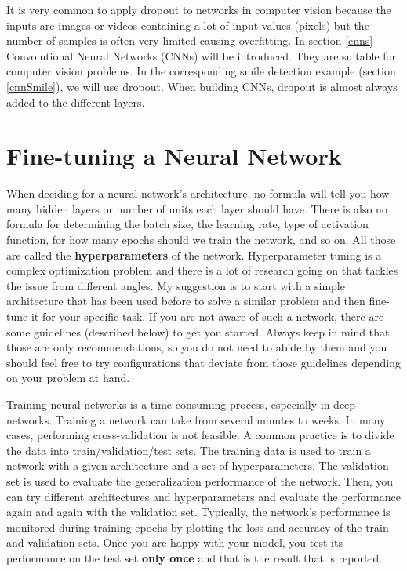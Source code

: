 \documentclass[
  11pt,
]{krantz}
\begin{document}
It is very common to apply dropout to networks in computer vision because the inputs are images or videos containing a lot of input values (pixels) but the number of samples is often very limited causing overfitting. In section \ref{cnns} Convolutional Neural Networks (CNNs) will be introduced. They are suitable for computer vision problems. In the corresponding smile detection example (section \ref{cnnSmile}), we will use dropout. When building CNNs, dropout is almost always added to the different layers.

\hypertarget{fine-tuning-a-neural-network}{%
\section{Fine-tuning a Neural Network}\label{fine-tuning-a-neural-network}}

When deciding for a neural network's architecture, no formula will tell you how many hidden layers or number of units each layer should have. There is also no formula for determining the batch size, the learning rate, type of activation function, for how many epochs should we train the network, and so on. All those are called the \textbf{hyperparameters} of the network. Hyperparameter tuning is a complex optimization problem and there is a lot of research going on that tackles the issue from different angles. My suggestion is to start with a simple architecture that has been used before to solve a similar problem and then fine-tune it for your specific task. If you are not aware of such a network, there are some guidelines (described below) to get you started. Always keep in mind that those are only recommendations, so you do not need to abide by them and you should feel free to try configurations that deviate from those guidelines depending on your problem at hand.

Training neural networks is a time-consuming process, especially in deep networks. Training a network can take from several minutes to weeks. In many cases, performing cross-validation is not feasible. A common practice is to divide the data into train/validation/test sets. The training data is used to train a network with a given architecture and a set of hyperparameters. The validation set is used to evaluate the generalization performance of the network. Then, you can try different architectures and hyperparameters and evaluate the performance again and again with the validation set. Typically, the network's performance is monitored during training epochs by plotting the loss and accuracy of the train and validation sets. Once you are happy with your model, you test its performance on the test set \textbf{only once} and that is the result that is reported.
\end{document}
